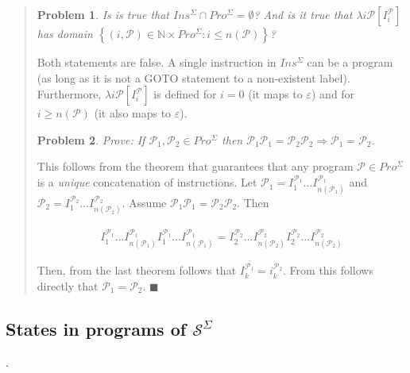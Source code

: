 \documentclass[a4paper, 12pt]{article}
\newtheorem{problem}{Problem}
\newtheorem{problem}{Problem}
\begin{document}
\small
\begin{quote}


\begin{problem}
    Is is true that $Ins^{\Sigma} \cap Pro^{\Sigma} = \emptyset$? And is it true
    that $\lambda i \mathcal{P} [I_i^{\mathcal{P}}]$ has domain $\left\{ (i,
    \mathcal{P}) \in \mathbb{N} \times Pro^{\Sigma}: i \leq n(\mathcal{P})
\right\} $?
\end{problem}

Both statements are false. A single instruction in $Ins^{\Sigma}$ can be a
program (as long as it is not a GOTO statement to a non-existent label).
Furthermore, $\lambda i \mathcal{P} [I_i^{\mathcal{P}}]$ is defined for $i = 0$
(it maps to $\varepsilon$) and for $i \geq n(\mathcal{P} )$ (it also maps to
$\varepsilon$).

\begin{problem}
    Prove: If $\mathcal{P}_1, \mathcal{P}_2 \in Pro^{\Sigma}$ then $\mathcal{P}_1
    \mathcal{P}_1 = \mathcal{P}_2 \mathcal{P}_2 \Rightarrow \mathcal{P}_1 =
    \mathcal{P}_2$.
\end{problem}

This follows from the theorem that guarantees that any program $\mathcal{P} \in
Pro^{\Sigma}$ is a \textit{unique} concatenation of instructions. Let
$\mathcal{P}_1 = I_1^{\mathcal{P}_1} \ldots I_{n(\mathcal{P}_1)}^{\mathcal{P}_1}$ and $\mathcal{P}_2 = I_1^{\mathcal{P}_2}
\ldots I_{n(\mathcal{P}_2)}^{\mathcal{P}_2}$. Assume $\mathcal{P}_1\mathcal{P}_1 =
\mathcal{P}_2 \mathcal{P}_2$. Then 

\begin{align*}
    I_1^{\mathcal{P}_1} \ldots I_{n(\mathcal{P}_1)}^{\mathcal{P}_1}
    I_1^{\mathcal{P}_1} \ldots I_{n(\mathcal{P}_1)}^{\mathcal{P}_1} = 
    I_2^{\mathcal{P}_2} \ldots I_{n(\mathcal{P}_2)}^{\mathcal{P}_2}
    I_2^{\mathcal{P}_2} \ldots I_{n(\mathcal{P}_2)}^{\mathcal{P}_2}
\end{align*}

Then, from the last theorem follows that $I_k^{\mathcal{P}_1} =
i_k^{\mathcal{P}_2}$. From this follows directly that $\mathcal{P}_1 =
\mathcal{P}_2$. $\blacksquare$

\end{quote}
\normalsize


\subsection{States in programs of $\mathcal{S}^{\Sigma}$}.
\end{document}
